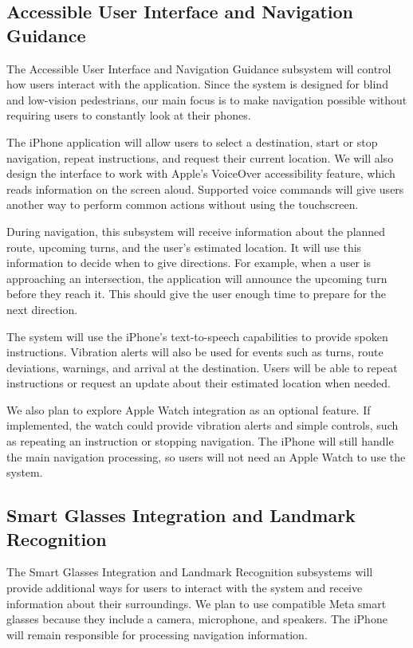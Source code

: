 \documentclass[12pt,letterpaper,oneside,reqno]{book}
\theoremstyle{plain}
\theoremstyle{definition}
\theoremstyle{plain}
\theoremstyle{remark}
\theoremstyle{plain}
\theoremstyle{definition}
\theoremstyle{plain}
\begin{document}
\subsection{Accessible User Interface and Navigation Guidance}
The Accessible User Interface and Navigation Guidance subsystem will control how users interact with the application. Since the system is designed for blind and low-vision pedestrians, our main focus is to make navigation possible without requiring users to constantly look at their phones.

The iPhone application will allow users to select a destination, start or stop navigation, repeat instructions, and request their current location. We will also design the interface to work with Apple's VoiceOver accessibility feature, which reads information on the screen aloud. Supported voice commands will give users another way to perform common actions without using the touchscreen.

During navigation, this subsystem will receive information about the planned route, upcoming turns, and the user's estimated location. It will use this information to decide when to give directions. For example, when a user is approaching an intersection, the application will announce the upcoming turn before they reach it. This should give the user enough time to prepare for the next direction.

The system will use the iPhone's text-to-speech capabilities to provide spoken instructions. Vibration alerts will also be used for events such as turns, route deviations, warnings, and arrival at the destination. Users will be able to repeat instructions or request an update about their estimated location when needed.

We also plan to explore Apple Watch integration as an optional feature. If implemented, the watch could provide vibration alerts and simple controls, such as repeating an instruction or stopping navigation. The iPhone will still handle the main navigation processing, so users will not need an Apple Watch to use the system.

\subsection{Smart Glasses Integration and Landmark Recognition}
The Smart Glasses Integration and Landmark Recognition subsystems will provide additional ways for users to interact with the system and receive information about their surroundings. We plan to use compatible Meta smart glasses because they include a camera, microphone, and speakers. The iPhone will remain responsible for processing navigation information.
\end{document}
